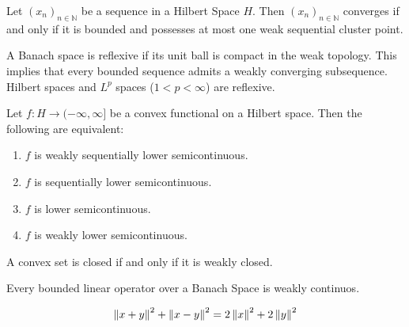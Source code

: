 \begin{lemma}
Let $(x_n)_{n \in \mathbb{N}}$ be a sequence in a Hilbert Space $H$. Then $(x_n)_{n \in \mathbb{N}}$ converges if and only if it is bounded and possesses at most one weak sequential cluster point.
\end{lemma}
\begin{fact}
	A Banach space is reflexive if its unit ball is compact in the weak topology. This implies that every bounded sequence admits a weakly converging subsequence. Hilbert spaces and $L^p$ spaces ($1<p<\infty$) are reflexive.
\end{fact}
\begin{theorem} 
	Let $f: H \rightarrow (−\infty, \infty]$ be a convex functional on a Hilbert space. Then the following are equivalent:
	\begin{enumerate}[label=(\roman{*})]
\item 	$f$ is weakly sequentially lower semicontinuous.
\item 	$f$ is sequentially lower semicontinuous.
\item 	$f$ is lower semicontinuous.
\item 	$f$ is weakly lower semicontinuous.
	\end{enumerate}
\end{theorem}



\begin{lemma}
	A convex set is closed if and only if it is weakly closed.
\end{lemma}

\begin{lemma}
	Every bounded linear operator over a Banach Space is weakly continuos.
\end{lemma}

\begin{lemma}
	
\[
\left\lVert x+y\right\rVert^2 +\left\lVert x-y\right\rVert^2 = 2\left\lVert x\right\rVert^2+2\left\lVert y\right\rVert^2
\]
\end{lemma}

